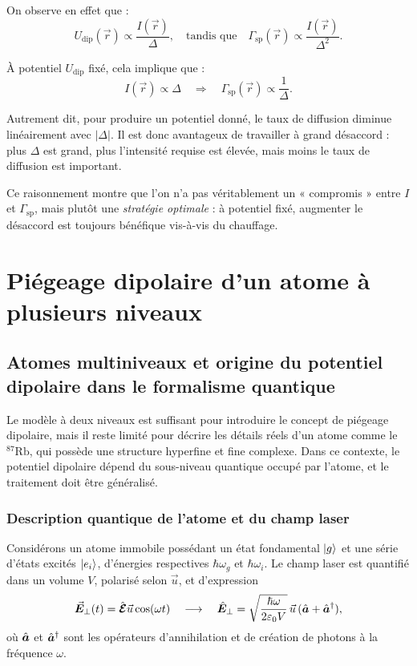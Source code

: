 On observe en effet que :
\[
U_{\mathrm{dip}}(\vec{r}) \propto \frac{I(\vec{r})}{\Delta}, \quad \text{tandis que} \quad \Gamma_{\mathrm{sp}}(\vec{r}) \propto \frac{I(\vec{r})}{\Delta^2}.
\]

À potentiel \( U_{\mathrm{dip}} \) fixé, cela implique que :
\[
I(\vec{r}) \propto \Delta \quad \Rightarrow \quad \Gamma_{\mathrm{sp}}(\vec{r}) \propto \frac{1}{\Delta}.
\]

Autrement dit, pour produire un potentiel donné, le taux de diffusion diminue linéairement avec \( |\Delta| \). Il est donc avantageux de travailler à grand désaccord : plus \( \Delta \) est grand, plus l’intensité requise est élevée, mais moins le taux de diffusion est important.

Ce raisonnement montre que l’on n’a pas véritablement un « compromis » entre \( I \) et \( \Gamma_{\mathrm{sp}} \), mais plutôt une {\em stratégie optimale} : à potentiel fixé, augmenter le désaccord est toujours bénéfique vis-à-vis du chauffage.


\section{Piégeage dipolaire d’un atome à plusieurs niveaux}

\subsection{Atomes multiniveaux et origine du potentiel dipolaire dans le formalisme quantique}

Le modèle à deux niveaux est suffisant pour introduire le concept de piégeage dipolaire, mais il reste limité pour décrire les détails réels d'un atome comme le \({}^{87}\mathrm{Rb}\), qui possède une structure hyperfine et fine complexe. Dans ce contexte, le potentiel dipolaire dépend du sous-niveau quantique occupé par l’atome, et le traitement doit être généralisé.

\subsubsection{Description quantique de l’atome et du champ laser}

Considérons un atome immobile possédant un état fondamental \( \ket{g} \) et une série d’états excités \( \ket{e_i} \), d’énergies respectives \( \hbar\omega_g \) et \( \hbar\omega_i \). Le champ laser est quantifié dans un volume \( V \), polarisé selon \( \vec{u} \), et d'expression 
\[
\vec{{\bm{E}}}_\perp(t) = \hat{\bm{\mathcal{E}}} \vec{u} \cos(\omega t) \quad \longrightarrow \quad \hat{\bm{E}}_\perp = \sqrt{\frac{\hbar \omega}{2\varepsilon_0 V}} \, \vec{u} \, (\hat{\bm{a}} + \hat{\bm{a}}^\dagger),
\]
où \( \hat{\bm{a}} \) et \( \hat{\bm{a}}^\dagger \) sont les opérateurs d’annihilation et de création de photons à la fréquence \( \omega \).

